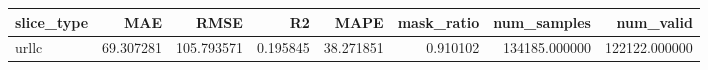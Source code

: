 \begin{tabular}{lrrrrrrr}
\toprule
slice_type & MAE & RMSE & R2 & MAPE & mask_ratio & num_samples & num_valid \\
\midrule
urllc & 69.307281 & 105.793571 & 0.195845 & 38.271851 & 0.910102 & 134185.000000 & 122122.000000 \\
\bottomrule
\end{tabular}
